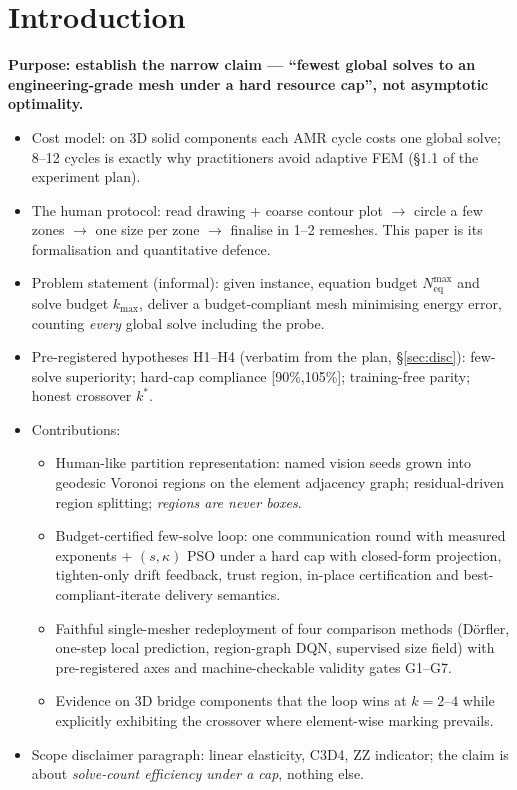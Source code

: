 \documentclass[preprint,12pt]{elsarticle}
\newcommand{\Neq}{N_{\mathrm{eq}}}
\newenvironment{plan}{\begin{itemize}\setlength\itemsep{0.15em}}{\end{itemize}}
\begin{document}
\section{Introduction}\label{sec:intro}
\textbf{Purpose: establish the narrow claim --- ``fewest global solves to an
engineering-grade mesh under a hard resource cap'', not asymptotic optimality.}
\begin{plan}
  \item Cost model: on 3D solid components each AMR cycle costs one global solve;
        8--12 cycles is exactly why practitioners avoid adaptive FEM
        (\S1.1 of the experiment plan).
  \item The human protocol: read drawing + coarse contour plot $\rightarrow$ circle a
        few zones $\rightarrow$ one size per zone $\rightarrow$ finalise in 1--2
        remeshes. This paper is its formalisation and quantitative defence.
  \item Problem statement (informal): given instance, equation budget $\Neq^{\max}$ and
        solve budget $k_{\max}$, deliver a budget-compliant mesh minimising energy
        error, counting \emph{every} global solve including the probe.
  \item Pre-registered hypotheses H1--H4 (verbatim from the plan, \S\ref{sec:disc}):
        few-solve superiority; hard-cap compliance [90\%,105\%]; training-free parity;
        honest crossover $k^*$.
  \item Contributions:
  \begin{plan}
    \item[C1] Human-like partition representation: named vision seeds grown into
          geodesic Voronoi regions on the element adjacency graph; residual-driven
          region splitting; \emph{regions are never boxes}.
    \item[C2] Budget-certified few-solve loop: one communication round with measured
          exponents + $(s,\kappa)$ PSO under a hard cap with closed-form projection,
          tighten-only drift feedback, trust region, in-place certification and
          best-compliant-iterate delivery semantics.
    \item[C3] Faithful single-mesher redeployment of four comparison methods
          (D\"orfler, one-step local prediction, region-graph DQN, supervised size
          field) with pre-registered axes and machine-checkable validity gates G1--G7.
    \item[C4] Evidence on 3D bridge components that the loop wins at $k=2$--$4$ while
          explicitly exhibiting the crossover where element-wise marking prevails.
  \end{plan}
  \item Scope disclaimer paragraph: linear elasticity, C3D4, ZZ indicator; the claim is
        about \emph{solve-count efficiency under a cap}, nothing else.
\end{plan}
\end{document}
